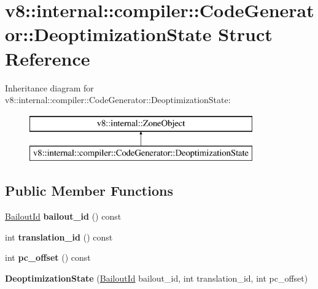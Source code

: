 \hypertarget{structv8_1_1internal_1_1compiler_1_1_code_generator_1_1_deoptimization_state}{}\section{v8\+:\+:internal\+:\+:compiler\+:\+:Code\+Generator\+:\+:Deoptimization\+State Struct Reference}
\label{structv8_1_1internal_1_1compiler_1_1_code_generator_1_1_deoptimization_state}
Inheritance diagram for v8\+:\+:internal\+:\+:compiler\+:\+:Code\+Generator\+:\+:Deoptimization\+State\+:\begin{figure}[H]
\begin{center}
\leavevmode
\includegraphics[height=2.000000cm]{structv8_1_1internal_1_1compiler_1_1_code_generator_1_1_deoptimization_state}
\end{center}
\end{figure}
\subsection*{Public Member Functions}
\begin{DoxyCompactItemize}
\item 
\hyperlink{classv8_1_1internal_1_1_bailout_id}{Bailout\+Id} {\bfseries bailout\+\_\+id} () const \hypertarget{structv8_1_1internal_1_1compiler_1_1_code_generator_1_1_deoptimization_state_afa83da3a2f443ea85b12f99e7cf63185}{}\label{structv8_1_1internal_1_1compiler_1_1_code_generator_1_1_deoptimization_state_afa83da3a2f443ea85b12f99e7cf63185}

\item 
int {\bfseries translation\+\_\+id} () const \hypertarget{structv8_1_1internal_1_1compiler_1_1_code_generator_1_1_deoptimization_state_a3f166a86ff168c500f3abef86de59bb6}{}\label{structv8_1_1internal_1_1compiler_1_1_code_generator_1_1_deoptimization_state_a3f166a86ff168c500f3abef86de59bb6}

\item 
int {\bfseries pc\+\_\+offset} () const \hypertarget{structv8_1_1internal_1_1compiler_1_1_code_generator_1_1_deoptimization_state_a9b37e9fa85bd91c294fa462a49774e8d}{}\label{structv8_1_1internal_1_1compiler_1_1_code_generator_1_1_deoptimization_state_a9b37e9fa85bd91c294fa462a49774e8d}

\item 
{\bfseries Deoptimization\+State} (\hyperlink{classv8_1_1internal_1_1_bailout_id}{Bailout\+Id} bailout\+\_\+id, int translation\+\_\+id, int pc\+\_\+offset)\hypertarget{structv8_1_1internal_1_1compiler_1_1_code_generator_1_1_deoptimization_state_acf4733204b0936bcd10cbb603a7df525}{}\label{structv8_1_1internal_1_1compiler_1_1_code_generator_1_1_deoptimization_state_acf4733204b0936bcd10cbb603a7df525}

\end{DoxyCompactItemize}
